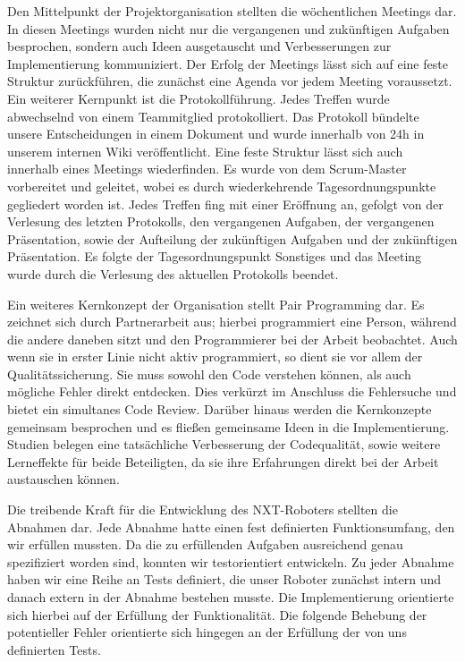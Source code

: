 \documentclass[oneside,abstractoff,a4paper]{scrartcl}
\begin{document}
Den Mittelpunkt der Projektorganisation stellten die wöchentlichen Meetings dar. In diesen Meetings wurden nicht nur die vergangenen und zukünftigen Aufgaben besprochen, sondern auch Ideen ausgetauscht und Verbesserungen zur Implementierung kommuniziert. Der Erfolg der Meetings lässt sich auf eine feste Struktur zurückführen, die zunächst eine Agenda vor jedem Meeting voraussetzt. Ein weiterer Kernpunkt ist die Protokollführung. Jedes Treffen wurde abwechselnd von einem Teammitglied protokolliert. 
Das Protokoll bündelte unsere Entscheidungen in einem Dokument und wurde innerhalb von 24h in unserem internen Wiki veröffentlicht. Eine feste Struktur lässt sich auch innerhalb eines Meetings wiederfinden. Es wurde von dem Scrum-Master vorbereitet und geleitet, wobei es durch wiederkehrende Tagesordnungspunkte gegliedert worden ist. Jedes Treffen fing mit einer Eröffnung an, gefolgt von der Verlesung des letzten Protokolls, den vergangenen Aufgaben, der vergangenen Präsentation, sowie der Aufteilung der zukünftigen Aufgaben und der zukünftigen Präsentation. Es folgte der Tagesordnungspunkt Sonstiges und das Meeting wurde durch die Verlesung des aktuellen Protokolls beendet.

Ein weiteres Kernkonzept der Organisation stellt Pair Programming dar. Es zeichnet sich durch Partnerarbeit aus; hierbei programmiert eine Person, während die andere daneben sitzt und den Programmierer bei der Arbeit beobachtet. Auch wenn sie in erster Linie nicht aktiv programmiert, so dient sie vor allem der Qualitätssicherung. Sie muss sowohl den Code verstehen können, als auch mögliche Fehler direkt entdecken. Dies verkürzt im Anschluss die Fehlersuche und bietet ein simultanes Code Review. Darüber hinaus werden die Kernkonzepte gemeinsam besprochen und es fließen gemeinsame Ideen in die Implementierung. Studien belegen eine tatsächliche Verbesserung der Codequalität, sowie weitere Lerneffekte für beide Beteiligten, da sie ihre Erfahrungen direkt bei der Arbeit austauschen können. %

Die treibende Kraft für die Entwicklung des NXT-Roboters stellten die Abnahmen dar. Jede Abnahme hatte einen fest definierten Funktionsumfang, den wir erfüllen mussten. Da die zu erfüllenden Aufgaben ausreichend genau spezifiziert worden sind, konnten wir testorientiert entwickeln. Zu jeder Abnahme haben wir eine Reihe an Tests definiert, die unser Roboter zunächst intern und danach extern in der Abnahme bestehen musste. Die Implementierung orientierte sich hierbei auf der Erfüllung der Funktionalität. Die folgende Behebung der potentieller Fehler orientierte sich hingegen an der Erfüllung der von uns definierten Tests.
\end{document}
